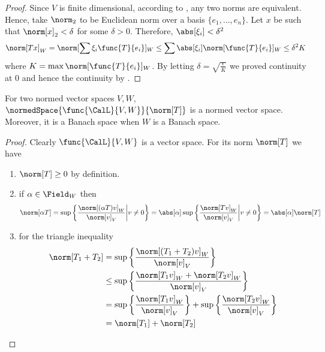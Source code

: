 \begin{proof}
    Since \(V\) is finite dimensional, according to , any two norms are equivalent. Hence, take \(\norm_2\) to be Euclidean norm over a basis \(\{e_1, \dots , e_n\}\). Let \(x\) be such that \(\norm[x]_2 < \delta\) for some \(\delta > 0\). Therefore, \(\abs[\xi_i] < \delta^2\)
    \begin{equation*}
        \norm[Tx]_W = \norm[\sum \xi_i \func{T}{e_i}]_W \leq \sum \abs[\xi_i] \norm[\func{T}{e_i}]_W \leq \delta^2 K
    \end{equation*}
    where \(K = \max \norm[\func{T}{e_i}]_W \). By letting \(\delta = \sqrt{\frac{\epsilon}{K}}\) we proved continuity at \(0\) and hence the continuity by .
\end{proof}

\begin{theorem}
    For two normed vector spaces \(V,W\), \(\normedSpace{\func{\CalL}{V,W}}{\norm[T]}\) is a normed vector space. Moreover, it is a Banach space when \(W\) is a Banach space.
\end{theorem}


\begin{proof}
    Clearly \(\func{\CalL}{V,W}\) is a vector space. For its norm \(\norm[T]\) we have
    \begin{enumerate}
        \item \(\norm[T] \geq 0\) by definition.
        \item if \(\alpha \in \Field_W\) then
              \begin{equation*}
                  \norm[\alpha T] = \sup \left\{ \dfrac{\norm[(\alpha T)v]_W}{\norm[v]_V} \middle| v \neq 0 \right\} = \abs[\alpha] \sup \left\{ \dfrac{\norm[Tv]_W}{\norm[v]_V} \middle| v \neq 0 \right\} = \abs[\alpha] \norm[T]
              \end{equation*}
        \item for the triangle inequality
              \begin{align*}
                  \norm[T_1 + T_2] & = \sup \left\{ \dfrac{\norm[(T_1 + T_2)v]_W}{\norm[v]_V} \right\}                                                     \\
                                   & \leq \sup \left\{ \dfrac{\norm[T_1v]_W + \norm[T_2v]_W}{\norm[v]_V} \right\}                                          \\
                                   & = \sup \left\{ \dfrac{\norm[T_1v]_W}{\norm[v]_V} \right\} + \sup \left\{ \dfrac{\norm[ T_2 v]_W}{\norm[v]_V} \right\} \\
                                   & = \norm[T_1] + \norm[T_2]
              \end{align*}
    \end{enumerate}

\end{proof}

